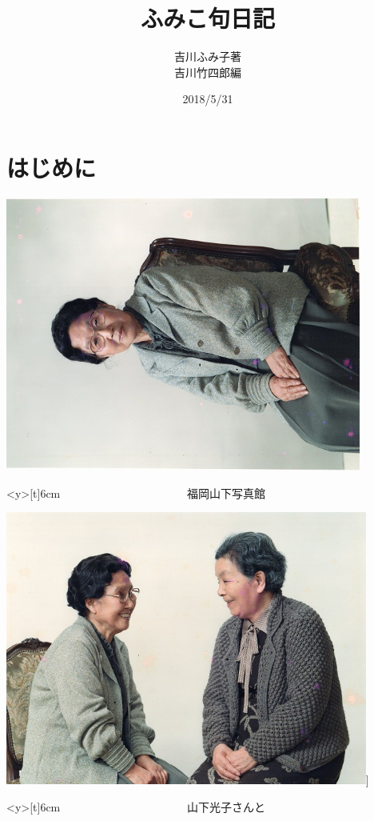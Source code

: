 \documentclass[b5paper]{tbook}
\begin{document}
\author{吉川ふみ子著\\吉川竹四郎編}
\title{ふみこ句日記}
\date{2018/5/31}
\maketitle
\tableofcontents
\chapter*{はじめに}

\includegraphics[height=9cm, angle=90, bb=0 0 640 640]{cat.jpg}
\begin{minipage}<y>[t]{6cm}
　　　　　　　　　　　福岡山下写真館
\end{minipage}
\includegraphics[height=9cm, angle=90, bb=0 0 640 640]{fumiko2.jpg}]\begin{minipage}<y>[t]{6cm}
　　　　　　　　　　　山下光子さんと
\end{minipage}
\end{document}
